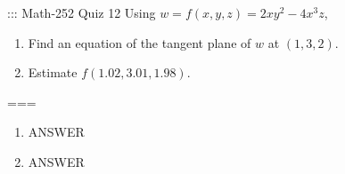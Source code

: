::: Math-252 Quiz 12
Using \(w=f(x,y,z)=2xy^2-4x^3z\),
\begin{enumerate}[label=\alph*]
  \item Find an equation of the tangent plane of \(w\) at \((1,3,2)\).
  \item Estimate \(f(1.02,3.01,1.98)\).
\end{enumerate}
===
\begin{enumerate}[label=\alph*]
  \item ANSWER
  \item ANSWER
\end{enumerate}
